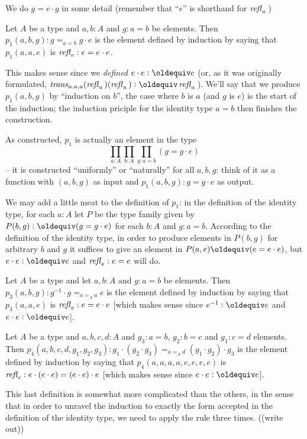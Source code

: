 We do $g=e\cdot g$ in some detail (remember that ``$e$'' is shorthand for $\mathop{{\it refl}_{a}}{}$)
\begin{definition}\label{def:p1}
  Let $A$ be a type and $a, b:A$ and $g:a=b$ be elements.  Then $p_1(a,b,g):g=_{a=b}g\cdot e$ is the element defined by induction by saying that $p_1(a,a,e)$ is $\mathop{{\it refl}_{e}}:e=e\cdot e$.
\end{definition}
\begin{remark}
  This makes sense since we \emph{defined} $e\cdot e\defequi e$ (or, as it was originally formulated, $\trans_{a,a,a}(\refl a{})(\refl a{})\defequi \refl a{}$).  We'll say that we produce $p_1(a,b,g)$ by ``induction on $b$'', the case where $b$ is $a$ (and $g$ is $e$) is the start of the induction; the induction priciple for the identity type $a=b$ then finishes the construction.

As constructed, $p_1$ is actually an element in the type
$$\prod_{a:A}\prod_{b:A}\prod_{g:a=b}(g=g\cdot e)$$ -- it is constructed ``uniformly'' or ``naturally'' for all $a,b,g$: think of it as a function with $(a,b,g)$ as input and $p_1(a,b,g):g=g\cdot e$ as output.

We may add a little meat to the definition of $p_1$: in the definition of the identity type, for each $a:A$ let $P$ be the type family given by $P(b,g)\defequi (g=g\cdot e)$ for each $b:A$ and $g:a=b$.  According to the definition of the identity type, in order to produce elements in $P(b,g)$ for arbitrary $b$ and $g$ it suffices to give an element in $P(a,e)\oldequiv (e=e\cdot e)$, but $e\cdot e\defequi e$ and $\mathop{{\it refl}_{e}}:e=e$ will do.
\end{remark}
\begin{definition}\label{def:p3}
  Let $A$ be a type and let $a,b:A$ and $g:a=b$ be elements.  Then $p_3(a,b,g):g^{-1}\cdot g=_{a=_Aa} e$ is the element defined by induction by saying that $p_3(a,a,e)$ is $\mathop{{\it refl}_{e}}:e=e\cdot e$ [which makes sense since $e^{-1}\defequi e$ and $e\cdot e\defequi e$].
\end{definition}
\begin{definition}\label{def:p4}
  Let $A$ be a type and $a,b,c,d:A$ and $g_3:a=b$, $g_2:b=c$ and $g_1:c=d$ elements.  Then $p_4(a,b,c,d,g_1,g_2,g_3):g_1\cdot(g_2\cdot g_3)=_{a=_Ad}(g_1\cdot g_2)\cdot g_3$ is the element defined by induction by saying that $p_4(a,a,a,a,e,e,e,e)$ is $\mathop{{\it refl}_{e}}:e\cdot(e\cdot e)=(e\cdot e)\cdot e$ [which makes sense since $e\cdot e\defequi e$].
\end{definition}
\begin{remark}
  This last definition is somewhat more complicated than the others, in the sense that in order to unravel the induction to exactly the form accepted in the definition of the identity type, we need to apply the rule three times.  ((write out))
\end{remark}

